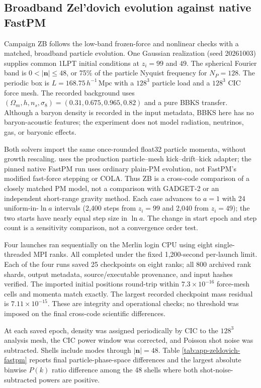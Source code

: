 \subsection{Broadband Zel'dovich evolution against native FastPM}
\label{app:zeldovich-fastpm}

Campaign ZB follows the low-band frozen-force and nonlinear checks with a
matched, broadband particle evolution.  One Gaussian realization (seed
20261003) supplies common 1LPT initial conditions at $z_i=99$ and $49$.
The spherical Fourier band is $0<|\boldsymbol n|\le48$, or 75\% of the
particle Nyquist frequency for $N_P=128$.  The periodic box is
$L=168.75\,h^{-1}\,\mathrm{Mpc}$ with a $128^3$ particle load and a $128^3$
CIC force mesh.  The recorded background uses $(\Omega_m,h,n_s,\sigma_8)=
(0.31,0.675,0.965,0.82)$ and a pure BBKS transfer.  Although a baryon density
is recorded in the input metadata, BBKS here has no baryon-acoustic features;
the experiment does not model radiation, neutrinos, gas, or baryonic effects.

Both solvers import the same once-rounded float32 particle momenta, without
growth rescaling.  \IPPL uses the production particle--mesh kick--drift--kick
adapter; the pinned native FastPM run uses ordinary plain-PM evolution, not
FastPM's modified fast-force stepping or COLA.  Thus ZB is a cross-code
comparison of a closely matched PM model, not a comparison with GADGET-2 or an
independent short-range gravity method.  Each case advances to $a=1$ with 24
uniform-in-$\ln a$ intervals (2,400 steps from $z_i=99$ and 2,040 from
$z_i=49$); the two starts have nearly equal step size in $\ln a$.  The change
in start epoch and step count is a sensitivity comparison, not a convergence
order test.

Four launches ran sequentially on the Merlin login CPU using eight
single-threaded MPI ranks.  All completed under the fixed 1,200-second
per-launch limit.  Each of the four runs saved 25 checkpoints on eight ranks;
all 800 archived rank shards, output metadata, source/executable provenance,
and input hashes verified.  The imported initial positions round-trip within
$7.3\times10^{-16}$ force-mesh cells and momenta match exactly.  The largest
recorded \IPPL checkpoint mass residual is $7.11\times10^{-15}$.  These are
integrity and operational checks; no threshold was imposed on the final
cross-code scientific differences.

At each saved epoch, density was assigned periodically by CIC to the $128^3$
analysis mesh, the CIC power window was corrected, and Poisson shot noise was
subtracted.  Shells include modes through $|\boldsymbol n|=48$.  Table
\ref{tab:app-zeldovich-fastpm} reports final particle-phase-space differences
and the largest absolute binwise $P(k)$ ratio difference among the 48 shells
where both shot-noise-subtracted powers are positive.

